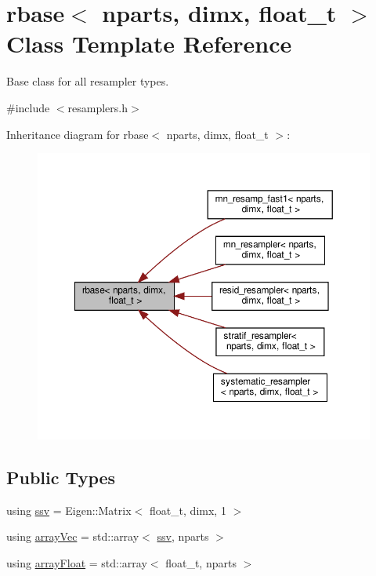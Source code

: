 \hypertarget{classrbase}{}\section{rbase$<$ nparts, dimx, float\+\_\+t $>$ Class Template Reference}
\label{classrbase}


Base class for all resampler types.  




{\ttfamily \#include $<$resamplers.\+h$>$}



Inheritance diagram for rbase$<$ nparts, dimx, float\+\_\+t $>$\+:\nopagebreak
\begin{figure}[H]
\begin{center}
\leavevmode
\includegraphics[width=350pt]{classrbase__inherit__graph}
\end{center}
\end{figure}
\subsection*{Public Types}
\begin{DoxyCompactItemize}
\item 
using \hyperlink{classrbase_ae20e0b8df15aa109252f57ecbf1f20f8}{ssv} = Eigen\+::\+Matrix$<$ float\+\_\+t, dimx, 1 $>$
\item 
using \hyperlink{classrbase_aa12fc826befa6ba0647b5f59ebc396ee}{array\+Vec} = std\+::array$<$ \hyperlink{classrbase_ae20e0b8df15aa109252f57ecbf1f20f8}{ssv}, nparts $>$
\item 
using \hyperlink{classrbase_a6f76bef853e508cb5b6f546d231b06f5}{array\+Float} = std\+::array$<$ float\+\_\+t, nparts $>$
\end{DoxyCompactItemize}
